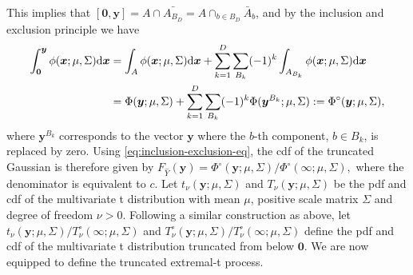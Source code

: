 \documentclass[lineno]{biometrika}
\begin{document}
This implies that 
$[\bm 0,\bm y] = A \cap \bar{A_{B_D}} = A \cap_{b \in B_D} \bar{A}_b$, 
and by the inclusion and exclusion principle we have
%
\begin{align}
\int_{\bm 0}^{\bm y} \phi(\bm x;\mu,\Sigma) \text d \bm x &= \int_{A} \phi(\bm x;\mu,\Sigma) \text d \bm x + \sum_{k=1}^D \sum_{B_k}(-1)^k \int_{A_{B_k}} \phi(\bm x;\mu,\Sigma) \text d \bm x   \nonumber \\
&= \Phi(\bm y;\mu,\Sigma) + \sum_{k=1}^D \sum_{B_k}(-1)^k \Phi(\bm y^{B_k};\mu,\Sigma):= \Phi^\circ(\bm y;\mu,\Sigma)\label{eq:inclusion-exclusion-eq},
\end{align}
%
where $\bm y^{B_k}$ corresponds to the vector $\bm y$ where the $b$-th component, $b\in B_k$, is replaced by zero. Using \eqref{eq:inclusion-exclusion-eq}, the cdf of the truncated Gaussian is therefore given by
%
$
F_{\hat{Y}}(\bm y) = \Phi^\circ(\bm y;\mu,\Sigma) / \Phi^\circ(\bm \infty;\mu,\Sigma),
$
where the denominator is equivalent to $c$.
%
%
Let $t_\nu(\bm y; \mu, \Sigma)$ and $T_\nu(\bm y; \mu, \Sigma)$ be the pdf and cdf of the multivariate t distribution with mean $\mu$, positive scale matrix $\Sigma$ and degree of freedom $\nu>0$. Following a similar construction as above, let $t_\nu(\bm y; \mu, \Sigma) / T_{\nu}^\circ( \bm \infty;\mu,\Sigma)$ and $T_{\nu}^\circ( \bm y;\mu,\Sigma)/ T_{\nu}^\circ( \bm \infty;\mu,\Sigma)$ define the pdf and cdf of the multivariate t distribution truncated from below $\bm 0$. We are now equipped to define the truncated extremal-t process.
% 
\end{document}
